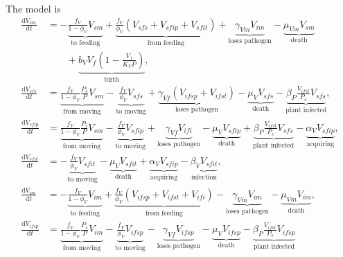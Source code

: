 \documentclass{article}
\newcommand{\md}{\mathrm{d}}
\begin{document}
The model is
\begin{equation}
  \label{odesystem}
  \begin{split}
    \frac{\md V_{sm}}{\md t}
    &=
    - \underbrace{\frac{f_V}{1 - \phi_V} V_{sm}}_{\text{to feeding}}
    + \underbrace{\frac{f_V}{\phi_V} (V_{sfs} + V_{sfip} + V_{sfit})}_{\text{from feeding}}
    + \underbrace{\gamma_{Vm} V_{im}}_{\text{loses pathogen}}
    - \underbrace{\mu_{Vm} V_{sm}}_{\text{death}}
    \\ & \quad\quad {}
    + \underbrace{b_V V_f \left(1 - \frac{V_f}{K_V P}\right)}_{\text{birth}},
    \\
    \frac{\md V_{sfs}}{\md t}
    &=
    \underbrace{\frac{f_V}{1 - \phi_V} \frac{P_s}{P} V_{sm}}_{\text{from moving}}
    - \underbrace{\frac{f_V}{\phi_V} V_{sfs}}_{\text{to moving}}
    + \underbrace{\gamma_{Vf} (V_{ifsp} + V_{ifst})}_{\text{loses pathogen}}
    - \underbrace{\mu_V V_{sfs}}_{\text{death}}
    - \underbrace{\beta_P \frac{V_{ifst}}{P_s} V_{sfs}}_{\text{plant
        infected}},
    \\
    \frac{\md V_{sfip}}{\md t}
    &=
    \underbrace{\frac{f_V}{1 - \phi_V} \frac{P_i}{P} V_{sm}}_{\text{from moving}}
    - \underbrace{\frac{f_V}{\phi_V} V_{sfip}}_{\text{to moving}}
    + \underbrace{\gamma_{Vf} V_{ifi}}_{\text{loses pathogen}}
    - \underbrace{\mu_V V_{sfip}}_{\text{death}}
    + \underbrace{\beta_P \frac{V_{ifst}}{P_s} V_{sfs}}_{\text{plant infected}}
    - \underbrace{\alpha_V V_{sfip}}_{\text{acquiring}},
    \\
    \frac{\md V_{sfit}}{\md t}
    &=
    - \underbrace{\frac{f_V}{\phi_V} V_{sfit}}_{\text{to moving}}
    - \underbrace{\mu_V V_{sfit}}_{\text{death}}
    + \underbrace{\alpha_V V_{sfip}}_{\text{acquiring}}
    - \underbrace{\beta_V V_{sfit}}_{\text{infection}},
    \\
    \frac{\md V_{im}}{\md t}
    &=
    - \underbrace{\frac{f_V}{1 - \phi_V} V_{im}}_{\text{to feeding}}
    + \underbrace{\frac{f_V}{\phi_V} (V_{ifsp} + V_{ifst} + V_{ifi})}_{\text{from feeding}}
    - \underbrace{\gamma_{Vm} V_{im}}_{\text{loses pathogen}}
    - \underbrace{\mu_{Vm} V_{im}}_{\text{death}},
    \\
    \frac{\md V_{ifsp}}{\md t}
    &=
    \underbrace{\frac{f_V}{1 - \phi_V} \frac{P_s}{P} V_{im}}_{\text{from moving}}
    - \underbrace{\frac{f_V}{\phi_V} V_{ifsp}}_{\text{to moving}}
    - \underbrace{\gamma_{Vf} V_{ifsp}}_{\text{loses pathogen}}
    - \underbrace{\mu_V V_{ifsp}}_{\text{death}}
    - \underbrace{\beta_P \frac{V_{ifst}}{P_s} V_{ifsp}}_{\text{plant infected}}

\end{split}
\end{equation}
\end{document}
